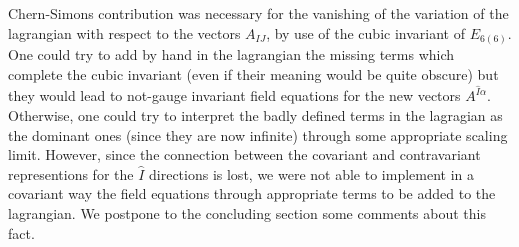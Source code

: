 \documentclass[a4paper,12pt]{article}
\begin{document}
Chern-Simons contribution was necessary for the vanishing of the
variation of the lagrangian with respect to the vectors $A_{IJ}$,
by use of the cubic invariant of $E_{6(6)}$. One could try to add
by hand in the lagrangian the missing terms which complete the
cubic invariant (even if their meaning would be quite obscure) but
they would lead to not-gauge invariant field equations for the new
vectors $A^{\hat I \alpha}$. Otherwise, one could try to interpret
the badly defined terms in the lagragian as the dominant ones
(since they are now infinite) through some appropriate scaling
limit. However, since the connection between the covariant and
contravariant representions for the $\hat I$ directions is lost,
we were not able to implement in a covariant way the field
equations through appropriate terms to be added to the lagrangian.
We postpone to the concluding section some comments about this
fact.
 \par
\end{document}
